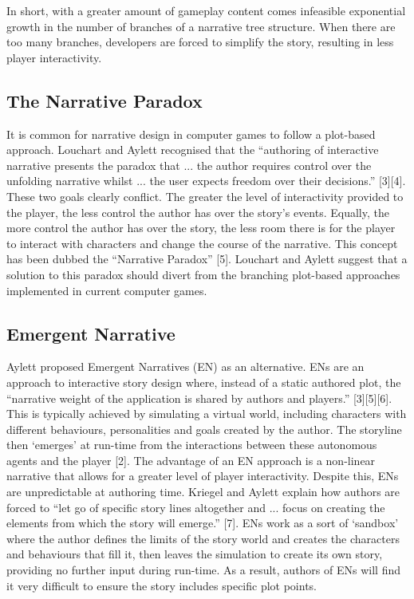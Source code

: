 \documentclass{sig-alternate-05-2015}
\begin{document}
In short, with a greater amount of gameplay content comes infeasible exponential growth in the number of branches of a narrative tree structure. When there are too many branches, developers are forced to simplify the story, resulting in less player interactivity.

\subsection{The Narrative Paradox}

It is common for narrative design in computer games to follow a plot-based approach. Louchart and Aylett recognised that the ``authoring of interactive narrative presents the paradox that ... the author requires control over the unfolding narrative whilst ... the user expects freedom over their decisions.'' [3][4]. These two goals clearly conflict. The greater the level of interactivity provided to the player, the less control the author has over the story's events. Equally, the more control the author has over the story, the less room there is for the player to interact with characters and change the course of the narrative. This concept has been dubbed the ``Narrative Paradox'' [5]. Louchart and Aylett suggest that a solution to this paradox should divert from the branching plot-based approaches implemented in current computer games.

\subsection{Emergent Narrative}

Aylett proposed Emergent Narratives (EN) as an alternative. ENs are an approach to interactive story design where, instead of a static authored plot, the ``narrative weight of the application is shared by authors and players.'' [3][5][6]. This is typically achieved by simulating a virtual world, including characters with different behaviours, personalities and goals created by the author. The storyline then `emerges' at run-time from the interactions between these autonomous agents and the player [2]. The advantage of an EN approach is a non-linear narrative that allows for a greater level of player interactivity. Despite this, ENs are unpredictable at authoring time. Kriegel and Aylett explain how authors are forced to ``let go of specific story lines altogether and ... focus on creating the elements from which the story will emerge.'' [7]. ENs work as a sort of `sandbox' where the author defines the limits of the story world and creates the characters and behaviours that fill it, then leaves the simulation to create its own story, providing no further input during run-time. As a result, authors of ENs will find it very difficult to ensure the story includes specific plot points.
\end{document}
